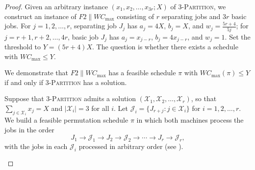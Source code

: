 ﻿\documentclass[12pt]{article}
\begin{document}
\begin{sloppypar}
\begin{proof}
            Given an arbitrary instance $(x_1, x_2, \ldots, x_{3r}; X)$ of 3-\textsc{Partition}, we construct an instance of $F2 \parallel WC_{\max}$ consisting of $r$ separating jobs and $3r$ basic jobs. For $j=1, 2, \ldots, r$, separating job $J_j$ has $a_j=4X$, $b_j=X$, and $w_j=\frac{5r+4}{5j}$; for $j=r+1, r+2, \ldots, 4r$, basic job $J_j$ has $a_j=x_{j-r}$, $b_j=4 x_{j-r}$, and $w_j=1$. Set the threshold to $Y=(5r+4)X$. The question is whether there exists a schedule with $W C_{\max} \leq Y$.
            
            We demonstrate that $F2 \parallel WC_{\max}$ has a feasible schedule $\pi$ with $W C_{\max}(\pi) \leq Y$ if and only if 3-\textsc{Partition} has a solution.
            
            Suppose that 3-\textsc{Partition} admits a solution $(\mathcal{X}_1, \mathcal{X}_2, \ldots, \mathcal{X}_r)$, so that $\sum_{j \in \mathcal{X}_i} x_j=X$ and $|\mathcal{X}_i|=3$ for all $i$. Let $\mathcal{J}_i=\{J_{r+j}: j \in \mathcal{X}_i\}$ for $i=1, 2, \ldots, r$. We build a feasible permutation schedule $\pi$ in which both machines process the jobs in the order 
            \begin{equation*}
                J_1 \to \mathcal{J}_1 \to J_2 \to \mathcal{J}_2 \to \cdots \to J_r \to \mathcal{J}_r,
            \end{equation*} 
            with the jobs in each $\mathcal{J}_i$ processed in arbitrary order (see ). 
            
            \begin{figure}[H]
                \centering
\end{figure}
\end{proof}
\end{sloppypar}
\end{document}
